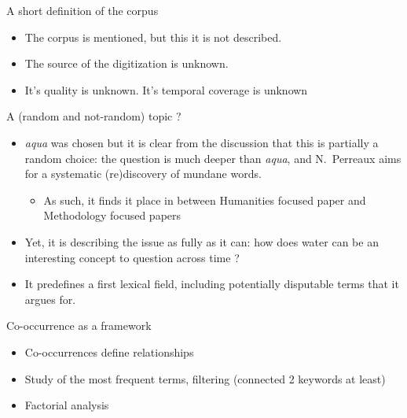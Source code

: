 \documentclass[aspectratio=169]{beamer}
\begin{document}
\begin{frame}{A short definition of the corpus}
    \begin{itemize}
        \item The corpus is mentioned, but this it is not described.
        \item The source of the digitization is unknown.
        \item It's quality is unknown.
        \items It's temporal coverage is unknown
    \end{itemize}
\end{frame}

\begin{frame}{A (random and not-random) topic ?}

    \begin{itemize}
        \item \textit{aqua} was chosen but it is clear from the discussion that this is partially a random choice: the question is much deeper than \textit{aqua}, and N.~Perreaux aims for a systematic (re)discovery of mundane words.
        \begin{itemize}
            \item As such, it finds it place in between Humanities focused paper and Methodology focused papers
        \end{itemize}
        \item Yet, it is describing the issue as fully as it can: how does water can be an interesting concept to question across time ?
        \item It predefines a first lexical field, including potentially disputable terms that it argues for.
    \end{itemize}
    
\end{frame}

\begin{frame}{Co-occurrence as a framework}
    \begin{itemize}
        \item Co-occurrences define relationships
        \item Study of the most frequent terms, filtering (connected 2 keywords at least)
        \item Factorial analysis
    \end{itemize}
\end{frame}
\end{document}
